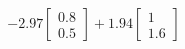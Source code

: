 \documentclass[preview]{standalone}
\begin{document}
\begin{align*}
-2.97 \begin{bmatrix} 0.8 \\ 0.5 \end{bmatrix} + 1.94 \begin{bmatrix} 1 \\ 1.6 \end{bmatrix}
\end{align*}
\end{document}
